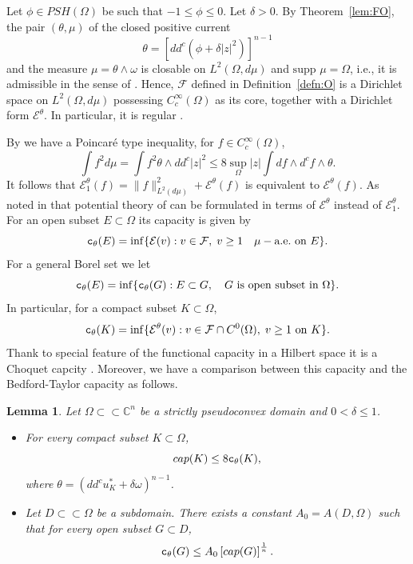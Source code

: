\documentclass{amsart}
\newcommand{\de}{\delta}
\newcommand{\om}{\omega}
\newcommand{\te}{\theta}
\newcommand{\tc}{{\tt c}}
\newcommand{\Om}{\Omega}
\newcommand{\cE}{\mathcal{E}}
\newcommand{\cF}{\mathcal{F}}
\newcommand{\supp}{\mbox{supp }}
\newcommand{\bC}{\mathbb{C}}
\newtheorem{lem}[thm]{Lemma}
\theoremstyle{definition}
\numberwithin{thm}{section}
\numberwithin{equation}{section}
\renewcommand{\[}{\begin{equation}}
\renewcommand{\]}{\end{equation}}
\newcommand{\wed}{\wedge}
\begin{document}
Let $\phi \in PSH(\Om)$ be such that $-1 \leq \phi \leq 0$. Let  $\de>0$.  By Theorem~\ref{lem:FO}, the pair $(\te, \mu)$ of the closed positive current 
\[\label{eq:current-te}
\te = [dd^c(\phi + \de |z|^2)]^{n-1}
\] and the measure $\mu = \te\wed \om$ is closable on $L^2(\Om, d\mu)$ and $\supp \mu = \Om$, i.e., it  is admissible in the sense of \cite[page 173]{FO87}. Hence, $\cF$ defined in Definition~\ref{defn:O} is a Dirichlet space on $L^2(\Om, d\mu)$ possessing $C^\infty_c(\Om)$ as its core, together with a Dirichlet form $\cE^\te$. In particular, it is regular \cite[page 6]{FOT94}.

By \cite[Th\'eor\`em~1]{Okada82} we have a Poincar\'e type inequality, for $f\in C^\infty_c(\Om)$,
$$
	\int f^2 d\mu = \int f^2 \te \wed dd^c |z|^2 \leq 8 \sup_\Om |z| \int df \wed d^c f \wed \te.
$$
It follows that $\cE_1^\te(f) = \| f  \|^2_{L^2(d\mu)} + \cE^\te(f)$ is equivalent to $\cE^\te(f)$. As noted in \cite[page 211]{FO84}  that potential theory of \cite[Chapter~2]{FOT94} can be formulated in terms of $\cE^\te$ instead of $\cE^\te_1$.  For an open  subset $E\subset \Om$ its capacity is given by
\[\label{eq:cap-te}
	\tc_\te (E) = \inf\{\cE(v) : v\in \cF, \; v\geq 1 \quad \mu-\text{\rm a.e.} \text{ on } E\}.
\]
For a general Borel set we let
$$
	\tc_\te(E) = \inf \{\tc_\te(G): E \subset G,  \quad G \text{ is open subset in }\Om\}.
$$
In particular, for a compact subset $K\subset \Om$,
$$
	\tc_\te(K) = \inf\{ \cE^\te(v): v\in \cF\cap C^0(\Om), \; v\geq 1 \text{ on }K\}.
$$
Thank to special feature of the functional capacity in a Hilbert space it is  a Choquet capcity \cite[Theorem~2.1.1]{FOT94}. 
Moreover,  we have a comparison between this capacity and the Bedford-Taylor capacity as follows.
\begin{lem}\label{lem:FO-polar} Let $\Om \subset \subset \bC^n$ be a strictly pseudoconvex domain and $0<\de \leq 1$.
\begin{itemize}
\item[(a)] For every compact subset $K\subset \Om$, 
$$
	cap (K) \leq 8 \tc_\te (K),
$$
where $\te= (dd^c u_K^* +\de \om)^{n-1}$.
\item[(b)] Let $D\subset \subset \Om$ be a subdomain. There exists a constant $A_0= A(D,\Om)$ such that  for every open subset $G\subset D$,
$$
	\tc_\te{(G)} \leq A_0 \left[cap (G)\right]^\frac{1}{n}.
$$ 
\end{itemize}
\end{lem}
\end{document}
